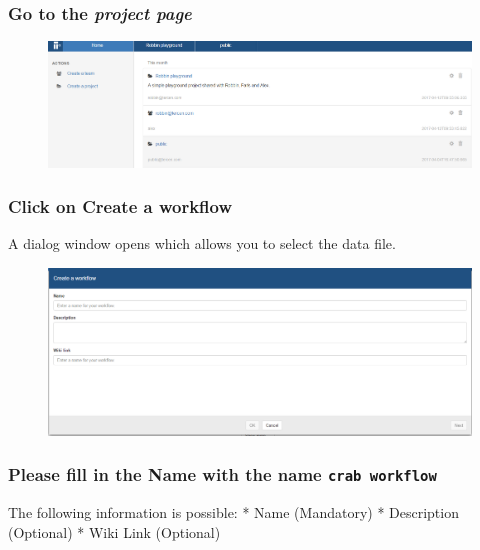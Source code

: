 \documentclass[]{book}
\theoremstyle{definition}
\theoremstyle{definition}
\theoremstyle{remark}
\begin{document}
\subsubsection{\texorpdfstring{Go to the \emph{project
page}}{Go to the project page}}\label{go-to-the-project-page}

\begin{figure}[htbp]
\centering
\includegraphics{images/project_home.png}
\caption{}
\end{figure}

\subsubsection{\texorpdfstring{Click on \textbf{Create a
workflow}}{Click on Create a workflow}}\label{click-on-create-a-workflow}

A dialog window opens which allows you to select the data file.

\begin{figure}[htbp]
\centering
\includegraphics{images/create_workflow.png}
\caption{}
\end{figure}

\subsubsection{\texorpdfstring{Please fill in the \textbf{Name} with the
name
\texttt{crab\ workflow}}{Please fill in the Name with the name crab workflow}}\label{please-fill-in-the-name-with-the-name-crab-workflow}

The following information is possible: * Name (Mandatory) * Description
(Optional) * Wiki Link (Optional)
\end{document}
